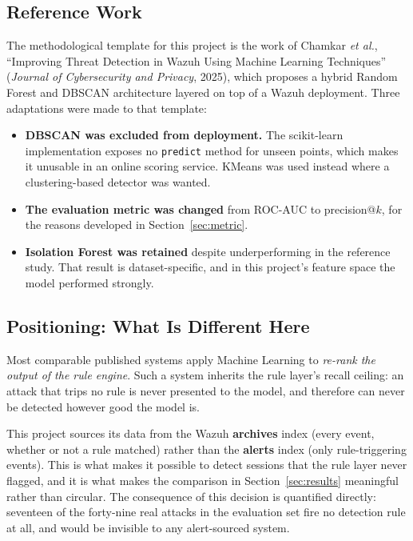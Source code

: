 \documentclass{classeENS}
\begin{document}
\subsection{Reference Work}
The methodological template for this project is the work of Chamkar \textit{et al.}, ``Improving Threat Detection in Wazuh Using Machine Learning Techniques'' (\textit{Journal of Cybersecurity and Privacy}, 2025), which proposes a hybrid Random Forest and DBSCAN architecture layered on top of a Wazuh deployment. Three adaptations were made to that template:

\begin{itemize}
    \item \textbf{DBSCAN was excluded from deployment.} The scikit-learn implementation exposes no \texttt{predict} method for unseen points, which makes it unusable in an online scoring service. KMeans was used instead where a clustering-based detector was wanted.
    \item \textbf{The evaluation metric was changed} from ROC-AUC to precision@$k$, for the reasons developed in Section~\ref{sec:metric}.
    \item \textbf{Isolation Forest was retained} despite underperforming in the reference study. That result is dataset-specific, and in this project's feature space the model performed strongly.
\end{itemize}

\subsection{Positioning: What Is Different Here}
Most comparable published systems apply Machine Learning to \emph{re-rank the output of the rule engine}. Such a system inherits the rule layer's recall ceiling: an attack that trips no rule is never presented to the model, and therefore can never be detected however good the model is.

This project sources its data from the Wazuh \textbf{archives} index (every event, whether or not a rule matched) rather than the \textbf{alerts} index (only rule-triggering events). This is what makes it possible to detect sessions that the rule layer never flagged, and it is what makes the comparison in Section~\ref{sec:results} meaningful rather than circular. The consequence of this decision is quantified directly: seventeen of the forty-nine real attacks in the evaluation set fire no detection rule at all, and would be invisible to any alert-sourced system.
\end{document}
